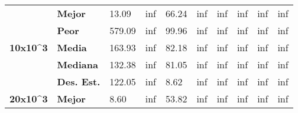\documentclass{article}
\begin{document}
\begin{table}[h!]
\begin{tabular}{|c|l|l|l|l|l|l|l|l|l|}
\multirow{5}{*}{\textbf{10x10\textasciicircum{}3}} & \textbf{Mejor}                            & 13.09                             & inf                               & 66.24                             & inf                               & inf                               & inf                               & inf                               & inf                               \\ \cline{2-10} 
                                                   & \textbf{Peor}                             & 579.09                            & inf                               & 99.96                             & inf                               & inf                               & inf                               & inf                               & inf                               \\ \cline{2-10} 
                                                   & \textbf{Media}                            & 163.93                            & inf                               & 82.18                             & inf                               & inf                               & inf                               & inf                               & inf                               \\ \cline{2-10} 
                                                   & \textbf{Mediana}                          & 132.38                            & inf                               & 81.05                             & inf                               & inf                               & inf                               & inf                               & inf                               \\ \cline{2-10} 
                                                   & \textbf{Des. Est.}                        & 122.05                            & inf                               & 8.62                              & inf                               & inf                               & inf                               & inf                               & inf                               \\ \hline
\multirow{5}{*}{\textbf{20x10\textasciicircum{}3}} & \textbf{Mejor}                            & 8.60                              & inf                               & 53.82                             & inf                               & inf                               & inf                               & inf                               & inf                               \\ \cline{2-10} 

\end{tabular}
\end{table}
\end{document}
